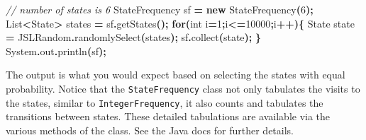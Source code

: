 \documentclass[
]{book}
\newenvironment{Shaded}{\begin{snugshade}}{\end{snugshade}}
\newcommand{\BuiltInTok}[1]{#1}
\newcommand{\CommentTok}[1]{\textcolor[rgb]{0.56,0.35,0.01}{\textit{#1}}}
\newcommand{\ControlFlowTok}[1]{\textcolor[rgb]{0.13,0.29,0.53}{\textbf{#1}}}
\newcommand{\DataTypeTok}[1]{\textcolor[rgb]{0.13,0.29,0.53}{#1}}
\newcommand{\DecValTok}[1]{\textcolor[rgb]{0.00,0.00,0.81}{#1}}
\newcommand{\FunctionTok}[1]{\textcolor[rgb]{0.00,0.00,0.00}{#1}}
\newcommand{\KeywordTok}[1]{\textcolor[rgb]{0.13,0.29,0.53}{\textbf{#1}}}
\newcommand{\NormalTok}[1]{#1}
\newcommand{\OperatorTok}[1]{\textcolor[rgb]{0.81,0.36,0.00}{\textbf{#1}}}
\theoremstyle{definition}
\theoremstyle{definition}
\theoremstyle{definition}
\theoremstyle{definition}
\theoremstyle{remark}
\begin{document}
\begin{Shaded}
\begin{Highlighting}[]
\CommentTok{// number of states is 6}
\NormalTok{StateFrequency sf }\OperatorTok{=} \KeywordTok{new} \FunctionTok{StateFrequency}\OperatorTok{(}\DecValTok{6}\OperatorTok{);}
\BuiltInTok{List}\OperatorTok{\textless{}}\BuiltInTok{State}\OperatorTok{\textgreater{}}\NormalTok{ states }\OperatorTok{=}\NormalTok{ sf}\OperatorTok{.}\FunctionTok{getStates}\OperatorTok{();}
\ControlFlowTok{for}\OperatorTok{(}\DataTypeTok{int}\NormalTok{ i}\OperatorTok{=}\DecValTok{1}\OperatorTok{;}\NormalTok{i}\OperatorTok{\textless{}=}\DecValTok{10000}\OperatorTok{;}\NormalTok{i}\OperatorTok{++)\{}
    \BuiltInTok{State}\NormalTok{ state }\OperatorTok{=}\NormalTok{ JSLRandom}\OperatorTok{.}\FunctionTok{randomlySelect}\OperatorTok{(}\NormalTok{states}\OperatorTok{);}
\NormalTok{    sf}\OperatorTok{.}\FunctionTok{collect}\OperatorTok{(}\NormalTok{state}\OperatorTok{);}
\OperatorTok{\}}
\BuiltInTok{System}\OperatorTok{.}\FunctionTok{out}\OperatorTok{.}\FunctionTok{println}\OperatorTok{(}\NormalTok{sf}\OperatorTok{);}
\end{Highlighting}
\end{Shaded}

The output is what you would expect based on selecting the states with equal probability. Notice that the \texttt{StateFrequency} class not only tabulates the visits to the states, similar to \texttt{IntegerFrequency}, it also counts and tabulates the transitions between states. These detailed tabulations are available via the various methods of the class. See the Java docs for further details.
\end{document}
